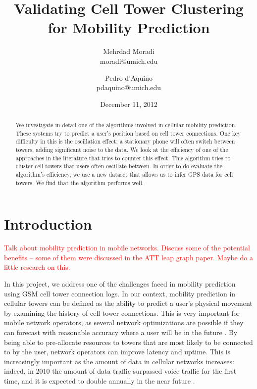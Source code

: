 \documentclass[letterpaper, 11pt, conference]{ieeeconf}
\newcommand{\xxx}[1]{\textcolor{red}{#1}}
\begin{document}
\title{Validating Cell Tower Clustering for Mobility Prediction}
\author{Mehrdad Moradi\\moradi@umich.edu \and Pedro d'Aquino\\pdaquino@umich.edu}
\date{December 11, 2012}

\maketitle

\begin{abstract}
We investigate in detail one of the algorithms involved in cellular mobility prediction. These systems try to predict a user's position based on cell tower connections. One key difficulty in this is the oscillation effect: a stationary phone will often switch between towers, adding significant noise to the data. We look at the efficiency of one of the approaches in the literature that tries to counter this effect.  This algorithm tries to cluster cell towers that users often oscillate between. In order to do evaluate the algorithm's efficiency, we use a new dataset that allows us to infer GPS data for cell towers. We find that the algorithm performs well.
\end{abstract}

\section{Introduction}
\label{sec:intro}
\xxx{Talk about mobility prediction in mobile networks. Discuss some of the potential benefits -- some of them were discussed in the
ATT leap graph paper. Maybe do a little research on this.}

In this project, we address one of the challenges faced in mobility prediction using GSM cell tower connection logs. In our context, mobility prediction in cellular
towers can be defined as the ability to predict a user's physical movement by examining the history of cell tower connections. This is very important
for mobile network operators, as several network optimizations are possible if they can forecast with reasonable accuracy
where a user will be in the future \cite{LeapGraph} \cite{Liu97anoptimal}. By being able to pre-allocate resources to towers that are most likely to
be connected to by the user, network operators can improve latency and uptime. This is increasingly important as the amount of data in cellular networks
increases: indeed, in 2010 the amount of data traffic surpassed voice traffic for the first time, and it is expected to double annually in the near future
\cite{EricssonData}.
\end{document}
